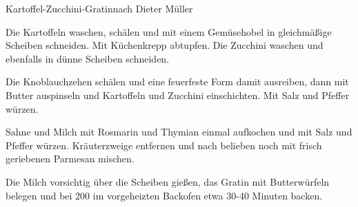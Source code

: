 \begin{recipe}{Kartoffel-Zucchini-Gratin}{nach Dieter Müller}
  \inglist

  \steps
  Die Kartoffeln waschen, schälen und mit einem Gemüsehobel in gleichmäßige Scheiben 
  schneiden. Mit Küchenkrepp abtupfen. Die Zucchini waschen und ebenfalls in dünne
  Scheiben schneiden. 
  
  Die Knoblauchzehen schälen und eine feuerfeste Form damit ausreiben, dann mit Butter 
  auspinseln und Kartoffeln und Zucchini einschichten. Mit Salz und Pfeffer würzen.

  Sahne und Milch mit Rosmarin und Thymian einmal aufkochen und mit Salz und Pfeffer 
  würzen. Kräuterzweige entfernen und nach belieben noch mit frisch geriebenen Parmesan 
  mischen. 
  
  Die Milch vorsichtig über die Scheiben gießen, das Gratin mit Butterwürfeln belegen und 
  bei 200 \celsius im vorgeheizten Backofen etwa 30-40 Minuten backen.
\end{recipe}
